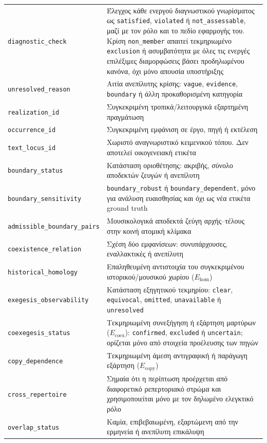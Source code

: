 \documentclass[11pt,a4paper]{article}
\begin{document}
{\begin{xltabular}{\textwidth}{@{}p{0.27\textwidth}Y@{}}
\texttt{diagnostic\_check} & Έλεγχος κάθε ενεργού διαγνωστικού γνωρίσματος ως \texttt{satisfied}, \texttt{violated} ή \texttt{not\_assessable}, μαζί με τον ρόλο και το πεδίο εφαρμογής του. Κρίση \texttt{non\_member} απαιτεί τεκμηριωμένο \texttt{exclusion} ή ασυμβατότητα με όλες τις ενεργές επιλέξιμες διαμορφώσεις βάσει προδηλωμένου κανόνα, όχι μόνο απουσία υποστήριξης\\
\texttt{unresolved\_reason} & Αιτία ανεπίλυτης κρίσης: \texttt{vague}, \texttt{evidence}, \texttt{boundary} ή άλλη προκαθορισμένη κατηγορία\\
\texttt{realization\_id} & Συγκεκριμένη τροπικά/λειτουργικά εξαρτημένη πραγμάτωση\\
\texttt{occurrence\_id} & Συγκεκριμένη εμφάνιση σε έργο, πηγή ή εκτέλεση\\
\texttt{text\_locus\_id} & Χωριστό αναγνωριστικό κειμενικού τόπου. Δεν αποτελεί οικογενειακή ετικέτα\\
\texttt{boundary\_status} & Κατάσταση οριοθέτησης: ακριβής, σύνολο αποδεκτών ζευγών ή ανεπίλυτη\\
\texttt{boundary\_sensitivity} & \texttt{boundary\_robust} ή \texttt{boundary\_dependent}, μόνο για ανάλυση ευαισθησίας και όχι ως νέα ετικέτα ground truth\\
\texttt{admissible\_boundary\_pairs} & Μουσικολογικά αποδεκτά ζεύγη αρχής--τέλους στην κοινή ατομική κλίμακα\\
\texttt{coexistence\_relation} & Σχέση δύο εμφανίσεων: συνυπάρχουσες, εναλλακτικές ή ανεπίλυτη\\
\texttt{historical\_homology} & Επαληθευμένη αντιστοιχία του συγκεκριμένου ιστορικού/μουσικού χωρίου ($E_{\mathrm{hom}}$)\\
\texttt{exegesis\_observability} & Κατάσταση εξηγητικού τεκμηρίου: \texttt{clear}, \texttt{equivocal}, \texttt{omitted}, \texttt{unavailable} ή \texttt{unresolved}\\
\texttt{coexegesis\_status} & Τεκμηριωμένη συνεξήγηση ή εξάρτηση μαρτύρων ($E_{\mathrm{coex}}$): \texttt{confirmed}, \texttt{excluded} ή \texttt{uncertain}; ορίζεται μόνο από στοιχεία προέλευσης των πηγών\\
\texttt{copy\_dependence} & Τεκμηριωμένη άμεση αντιγραφική ή παράγωγη εξάρτηση ($E_{\mathrm{copy}}$)\\
\texttt{cross\_repertoire} & Σημαία ότι η περίπτωση προέρχεται από διαφορετικό ρεπερτοριακό στρώμα και χρησιμοποιείται μόνο με τον δηλωμένο ελεγκτικό ρόλο\\
\texttt{overlap\_status} & Καμία, επιβεβαιωμένη, εξαρτώμενη από την ερμηνεία ή ανεπίλυτη επικάλυψη\\

\end{xltabular}}
\end{document}
